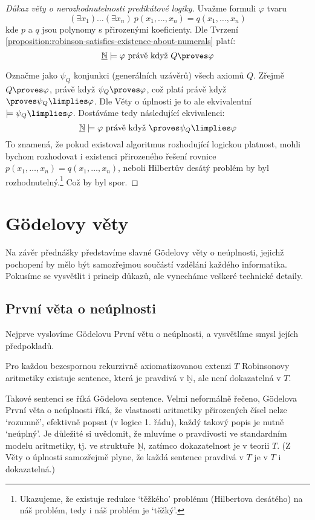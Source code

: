 \begin{proof}[Důkaz věty o nerozhodnutelnosti predikátové logiky]
Uvažme formuli $\varphi$ tvaru 
$$(\exists x_1)\dots(\exists x_n)\ p(x_1,\dots,x_n)=q(x_1,\dots,x_n)
$$ 
kde $p$ a $q$ jsou polynomy s přirozenými koeficienty. Dle Tvrzení \ref{proposition:robinson-satisfies-existence-about-numerals} platí:
$$
\underline{\mathbb N}\models \varphi\text{ právě když }Q\proves \varphi
$$

Označme jako $\psi_Q$ konjunkci (generálních uzávěrů) všech axiomů $Q$. Zřejmě $Q\proves\varphi$, právě když $\psi_Q\proves\varphi$, což platí právě když $\proves\psi_Q\limplies\varphi$. Dle Věty o úplnosti je to ale ekvivalentní $\models\psi_Q\limplies\varphi$. Dostáváme tedy následující ekvivalenci:
$$
\underline{\mathbb N}\models \varphi\text{ právě když }\proves \psi_Q\limplies\varphi
$$
To znamená, že pokud existoval algoritmus rozhodující logickou platnost, mohli bychom rozhodovat i existenci přirozeného řešení rovnice $p(x_1,\dots,x_n)=q(x_1,\dots,x_n)$, neboli Hilbertův desátý problém by byl rozhodnutelný.\footnote{Ukazujeme, že existuje \alert{redukce} `těžkého' problému (Hilbertova desátého) na náš problém, tedy i náš problém je `těžký'.} Což by byl spor.   
\end{proof}

\section{Gödelovy věty}

Na závěr přednášky představíme slavné Gödelovy věty o neúplnosti, jejichž pochopení by mělo být samozřejmou součástí vzdělání každého informatika. Pokusíme se vysvětlit i princip důkazů, ale vynecháme veškeré technické detaily.

\subsection{První věta o neúplnosti}

Nejprve vyslovíme Gödelovu \alert{První větu o neúplnosti}, a vysvětlíme smysl jejích předpokladů.

\begin{theorem}
Pro každou bezespornou rekurzivně axiomatizovanou extenzi $T$ Robinsonovy aritmetiky existuje sentence, která je pravdivá v $\underline{\mathbb N}$, ale není dokazatelná v $T$.    
\end{theorem}

Takové sentenci se říká \alert{Gödelova sentence}. Velmi neformálně řečeno, Gödelova První věta o neúplnosti říká, že vlastnosti aritmetiky přirozených čísel nelze `rozumně', efektivně popsat (v logice 1. řádu), každý takový popis je nutně `neúplný'. Je důležité si uvědomit, že mluvíme o \alert{pravdivosti} ve standardním modelu aritmetiky, tj. ve struktuře $\underline{\mathbb N}$, zatímco \alert{dokazatelnost} je v teorii $T$. (Z Věty o úplnosti samozřejmě plyne, že každá sentence \alert{pravdivá v $T$} je v $T$ i dokazatelná.)

